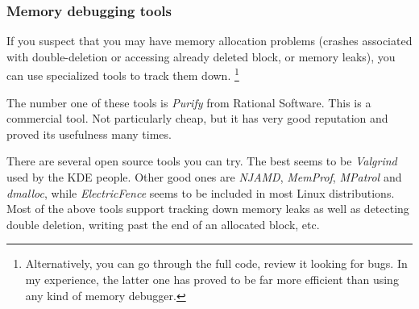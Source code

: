 \subsubsection{Memory debugging tools}

If you suspect that you may have memory allocation problems
(crashes associated with double-deletion or accessing already
deleted block, or memory leaks), you can use specialized tools
to track them down.
  \footnote{Alternatively, you can go through the full code,
  review it looking for bugs. In my experience, the latter one
  has proved to be far more efficient than using any kind
  of memory debugger.}

The number one of these tools is \textit{Purify} from Rational Software.
This is a commercial tool. Not particularly cheap, but it has
very good reputation and proved its usefulness many times.

There are several open source tools you can try. The best seems
to be \textit{Valgrind} used by the KDE people.
Other good ones are \textit{NJAMD}, \textit{MemProf}, \textit{MPatrol}
and \textit{dmalloc}, while \textit{ElectricFence} seems
to be included in most Linux distributions.
Most of the above tools support tracking down memory leaks as well as
detecting double deletion, writing past the end of an allocated block, etc.


%
%
%
%



